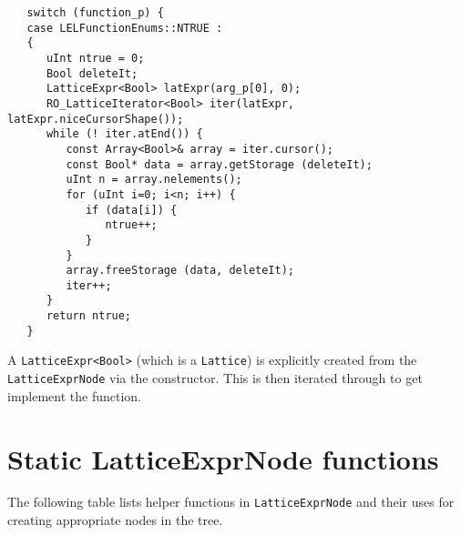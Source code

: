 \begin{verbatim}
   switch (function_p) {
   case LELFunctionEnums::NTRUE :
   {
      uInt ntrue = 0;
      Bool deleteIt;
      LatticeExpr<Bool> latExpr(arg_p[0], 0);
      RO_LatticeIterator<Bool> iter(latExpr, latExpr.niceCursorShape());
      while (! iter.atEnd()) {
         const Array<Bool>& array = iter.cursor();
         const Bool* data = array.getStorage (deleteIt);
         uInt n = array.nelements();
         for (uInt i=0; i<n; i++) {
            if (data[i]) {
               ntrue++;
            }
         }
         array.freeStorage (data, deleteIt);
         iter++;
      }
      return ntrue; 
   }
\end{verbatim}
 
A {\tt LatticeExpr<Bool>} (which is a {\tt Lattice}) is explicitly
created from the {\tt LatticeExprNode} via the constructor.  This is
then iterated through to get implement the function. 


\section {Static LatticeExprNode functions}

The following table lists helper functions in {\tt LatticeExprNode}
and their uses for creating appropriate nodes in the tree.


